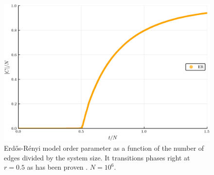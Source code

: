 \begin{figure}[H]
	\centering
	\includegraphics[width=350pt]{images/Network_ER_1e6_order_param.png}
	\caption{Erdős-Rényi model order parameter as a function of the number of edges divided by the system size. It transitions phases right at $r = 0.5$ as has been proven \cite{ER_2}. $N = 10^6$.}
	\label{fig:ER_transition}
\end{figure}
